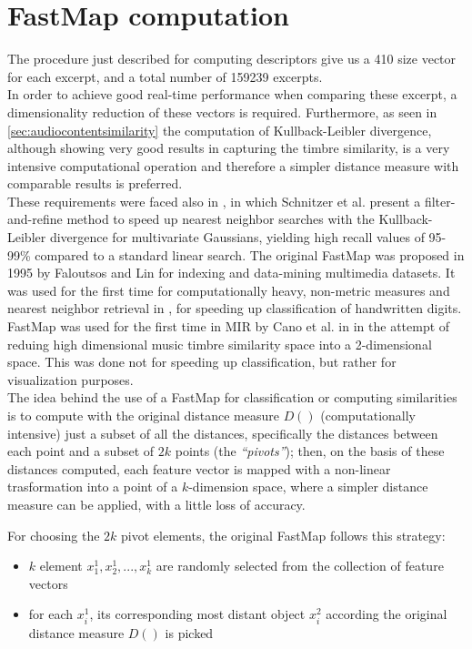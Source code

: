 \section{FastMap computation}
\label{sec:fastmap}
The procedure just described for computing descriptors give us a 410 size vector for each excerpt, and a total number of 159239 excerpts.\\
In order to achieve good real-time performance when comparing these excerpt, a dimensionality reduction of these vectors is required. Furthermore, as seen in \ref{sec:audiocontentsimilarity} the computation of Kullback-Leibler divergence, although showing very good results in capturing the timbre similarity, is a very intensive computational operation and therefore a simpler distance measure with comparable results is preferred. \\
These requirements were faced also in \cite{fastmap12}, in which Schnitzer et al. present a filter-and-refine method to speed up nearest neighbor searches with the Kullback-Leibler divergence for multivariate Gaussians, yielding high recall values of 95-99\% compared to a standard linear search. The original FastMap was proposed in 1995 by Faloutsos and Lin \cite{falo95} for indexing and data-mining multimedia datasets. It was used for the first time for computationally heavy, non-metric measures and nearest neighbor retrieval in \cite{athi04}, for speeding up classification of handwritten digits. FastMap was used for the first time in MIR by Cano et al. in \cite{cano02} in the attempt of reduing high dimensional music timbre similarity space into a 2-dimensional space. This was done not for speeding up classification, but rather for visualization purposes. \\
The idea behind the use of a FastMap for classification or computing similarities is to compute with the original distance measure $D()$ (computationally intensive) just a subset of all the distances, specifically the distances between each point and a subset of $2k$ points (the \textit{``pivots''}); then, on the basis of these distances computed, each feature vector is mapped with a non-linear trasformation into a point of a $k$-dimension space, where a simpler distance measure can be applied, with a little loss of accuracy.

For choosing the $2k$ pivot elements, the original FastMap \cite{falo95} follows this strategy:
\begin{itemize}
\item $k$ element $x_1^1, x_2^1, ..., x_k^1$ are randomly selected from the collection of feature vectors
\item for each $x_i^1$, its corresponding most distant object $x_i^2$ according the original distance measure $D()$ is picked
\end{itemize}

